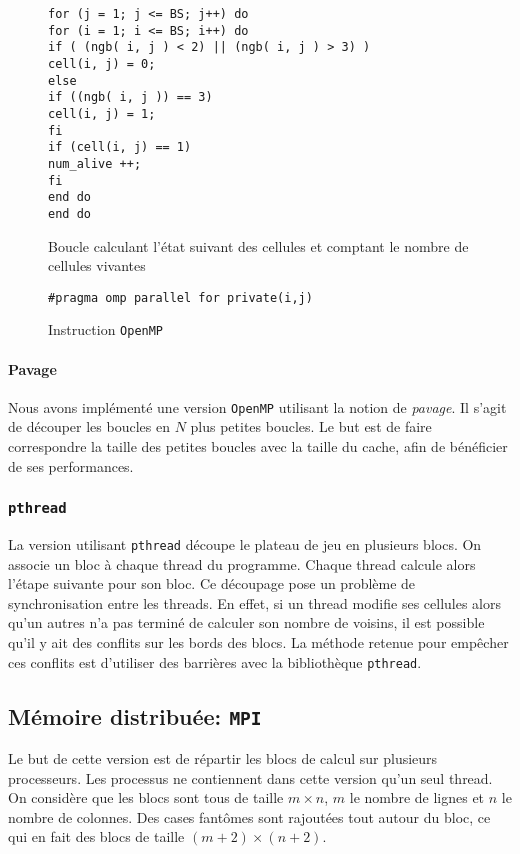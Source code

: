 \begin{figure}[h!]
\begin{lstlisting}
for (j = 1; j <= BS; j++) do
for (i = 1; i <= BS; i++) do
if ( (ngb( i, j ) < 2) || (ngb( i, j ) > 3) ) 
cell(i, j) = 0;
else 
if ((ngb( i, j )) == 3)
cell(i, j) = 1;
fi
if (cell(i, j) == 1) 
num_alive ++;
fi
end do
end do
\end{lstlisting}
\caption{Boucle calculant l'état suivant des cellules et comptant le nombre de cellules vivantes}
\label{boucle_actualisation}
\end{figure}

\begin{figure}[h!]
\begin{lstlisting}
#pragma omp parallel for private(i,j)
\end{lstlisting}
\caption{Instruction \texttt{OpenMP}}
\label{omp_parallel}
\end{figure}

\paragraph{Pavage}
Nous avons implémenté une version \texttt{OpenMP} utilisant la notion de \emph{pavage}. Il s'agit de découper les boucles en $N$ plus petites boucles. Le but est de faire correspondre la taille des petites boucles avec la taille du cache, afin de bénéficier de ses performances. 

\subsubsection{\texttt{pthread}}
\label{pthread}

La version utilisant \texttt{pthread} découpe le plateau de jeu en plusieurs blocs. On associe un bloc à chaque thread du programme. Chaque thread calcule alors l'étape suivante pour son bloc. Ce découpage pose un problème de synchronisation entre les threads. En effet, si un thread modifie ses cellules alors qu'un autres n'a pas terminé de calculer son nombre de voisins, il est possible qu'il y ait des conflits sur les bords des blocs. La méthode retenue pour empêcher ces conflits est d'utiliser des barrières avec la bibliothèque \texttt{pthread}.

\subsection{Mémoire distribuée: \texttt{MPI}} %
\label{mpi}

Le but de cette version est de répartir les blocs de calcul sur plusieurs processeurs. Les processus ne contiennent dans cette version qu'un seul thread. On considère que les blocs sont tous de taille $m \times n$, $m$ le nombre de lignes et $n$ le nombre de colonnes. Des cases fantômes sont rajoutées tout autour du bloc, ce qui en fait des blocs de taille $(m+2) \times (n+2)$.

